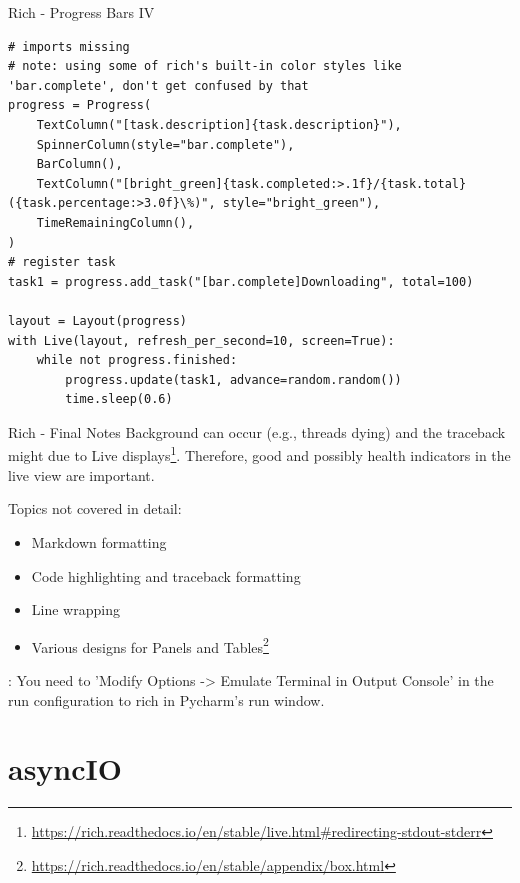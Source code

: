 \documentclass[12pt, aspectratio=169, usepdftitle=false]{beamer}
\newcommand{\furl}[1]{\footnote{\url{#1}}}
\newcommand{\nll}[1]{\note{\LARGE{#1}}}
\begin{document}
\begin{frame}[fragile]{Rich - Progress Bars IV}
	\begin{lstlisting}[language=pytiny]
# imports missing
# note: using some of rich's built-in color styles like 'bar.complete', don't get confused by that
progress = Progress(
    TextColumn("[task.description]{task.description}"),
    SpinnerColumn(style="bar.complete"),
    BarColumn(),
    TextColumn("[bright_green]{task.completed:>.1f}/{task.total} ({task.percentage:>3.0f}\%)", style="bright_green"),
    TimeRemainingColumn(),
)
# register task
task1 = progress.add_task("[bar.complete]Downloading", total=100)

layout = Layout(progress)
with Live(layout, refresh_per_second=10, screen=True):
    while not progress.finished:
        progress.update(task1, advance=random.random())
        time.sleep(0.6)
	\end{lstlisting}
\end{frame}


\begin{frame}{Rich - Final Notes}
	Background  can occur (e.g., threads dying) and the traceback might  due to Live displays\furl{https://rich.readthedocs.io/en/stable/live.html\#redirecting-stdout-stderr}.
	\newline 
	Therefore, good  and possibly health indicators in the live view are important.
	
	\medskip
	
	Topics not covered in detail:
	\begin{itemize}
		\item Markdown formatting
		\item Code highlighting and traceback formatting
		\item Line wrapping
		\item Various designs for Panels and Tables\furl{https://rich.readthedocs.io/en/stable/appendix/box.html}
	\end{itemize}
	: You need to  'Modify Options -> Emulate Terminal in Output Console' in the run configuration to  rich in Pycharm's run window.
	\nll{Watch out for deadlocks!}
	
\end{frame}


{}


\section{asyncIO}
\end{document}
